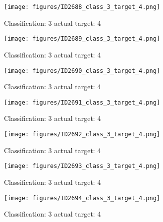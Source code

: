 \begin{figure}[h!]
\begin{center}
\texttt{[image: figures/ID2688\_class\_3\_target\_4.png]}
\end{center}
\caption{ Classification: 3 actual target: 4}
\label{fig:ID2688_class_3_target_4}
\end{figure}
\begin{figure}[h!]
\begin{center}
\texttt{[image: figures/ID2689\_class\_3\_target\_4.png]}
\end{center}
\caption{ Classification: 3 actual target: 4}
\label{fig:ID2689_class_3_target_4}
\end{figure}
\begin{figure}[h!]
\begin{center}
\texttt{[image: figures/ID2690\_class\_3\_target\_4.png]}
\end{center}
\caption{ Classification: 3 actual target: 4}
\label{fig:ID2690_class_3_target_4}
\end{figure}
\begin{figure}[h!]
\begin{center}
\texttt{[image: figures/ID2691\_class\_3\_target\_4.png]}
\end{center}
\caption{ Classification: 3 actual target: 4}
\label{fig:ID2691_class_3_target_4}
\end{figure}
\begin{figure}[h!]
\begin{center}
\texttt{[image: figures/ID2692\_class\_3\_target\_4.png]}
\end{center}
\caption{ Classification: 3 actual target: 4}
\label{fig:ID2692_class_3_target_4}
\end{figure}
\begin{figure}[h!]
\begin{center}
\texttt{[image: figures/ID2693\_class\_3\_target\_4.png]}
\end{center}
\caption{ Classification: 3 actual target: 4}
\label{fig:ID2693_class_3_target_4}
\end{figure}
\begin{figure}[h!]
\begin{center}
\texttt{[image: figures/ID2694\_class\_3\_target\_4.png]}
\end{center}
\caption{ Classification: 3 actual target: 4}
\label{fig:ID2694_class_3_target_4}
\end{figure}
